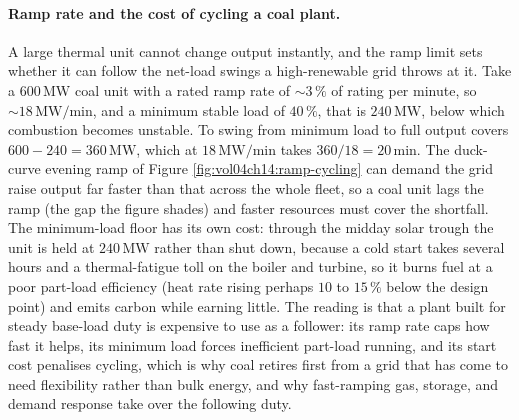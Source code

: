 \paragraph{Ramp rate and the cost of cycling a coal plant.} A large thermal
unit cannot change output instantly, and the ramp limit sets whether it can
follow the net-load swings a high-renewable grid throws at it. Take a
$600\,\si{\mega\watt}$ coal unit with a rated ramp rate of $\sim 3\,\%$ of
rating per minute, so $\sim 18\,\si{\mega\watt}/\si{\minute}$, and a minimum
stable load of $40\,\%$, that is $240\,\si{\mega\watt}$, below which combustion
becomes unstable. To swing from minimum load to full output covers
$600 - 240 = 360\,\si{\mega\watt}$, which at $18\,\si{\mega\watt}/\si{\minute}$
takes $360/18 = 20\,\si{\minute}$. The duck-curve evening ramp of Figure
\ref{fig:vol04ch14:ramp-cycling} can demand the grid raise output far faster
than that across the whole fleet, so a coal unit lags the ramp (the gap the
figure shades) and faster resources must cover the shortfall. The minimum-load
floor has its own cost: through the midday solar trough the unit is held at
$240\,\si{\mega\watt}$ rather than shut down, because a cold start takes
several hours and a thermal-fatigue toll on the boiler and turbine, so it burns
fuel at a poor part-load efficiency (heat rate rising perhaps $10$ to $15\,\%$
below the design point) and emits carbon while earning little. The reading is
that a plant built for steady base-load duty is expensive to use as a
follower: its ramp rate caps how fast it helps, its minimum load forces
inefficient part-load running, and its start cost penalises cycling, which is
why coal retires first from a grid that has come to need flexibility rather
than bulk energy, and why fast-ramping gas, storage, and demand response take
over the following duty.



